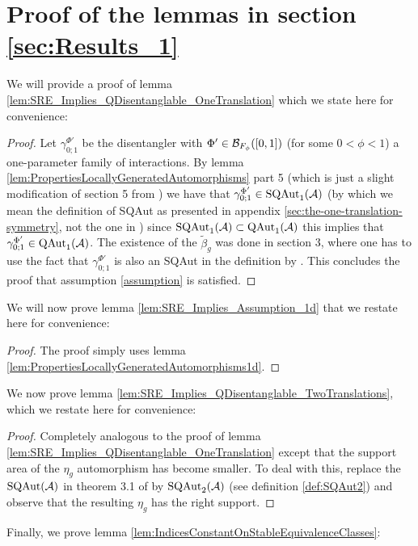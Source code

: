 \documentclass[11pt,a4paper,twoside]{article}
\numberwithin{equation}{section}
\begin{document}
	\section{Proof of the lemmas in section \ref{sec:Results_1}}\label{sec:ProofOfMainResult1}\label{sec:ProofOf:lem:IndicesConstantOnStableEquivalenceClasses}
	We will provide a proof of lemma \ref{lem:SRE_Implies_QDisentanglable_OneTranslation} which we state here for convenience:
	\SREImpliesQDisentanglableOneTranslation*
	\begin{proof}
		Let $\gamma^{\Phi'}_{0;1}$ be the disentangler with $\Phi'\in\BB_{F_\phi}([0,1])$ (for some $0<\phi<1$) a one-parameter family of interactions. By lemma \ref{lem:PropertiesLocallyGeneratedAutomorphisms} part 5 (which is just a slight modification of section 5 from \cite{ogata2021h3gmathbb}) we have that $\gamma^{\Phi'}_{0;1}\in\textrm{SQAut}_1(\AA)$ (by which we mean the definition of SQAut as presented in appendix \ref{sec:the-one-translation-symmetry}, not the one in \cite{ogata2021h3gmathbb}) since $\textrm{SQAut}_1(\AA)\subset\QAut{\AA}$ this implies that $\gamma^{\Phi'}_{0;1}\in\QAut{\AA}$. The existence of the $\tilde{\beta}_g$ was done in \cite{ogata2021h3gmathbb} section 3, where one has to use the fact that $\gamma^{\Phi'}_{0;1}$ is also an SQAut in the definition by \cite{ogata2021h3gmathbb}. This concludes the proof that assumption \ref{assumption} is satisfied.
	\end{proof}
	We will now prove lemma \ref{lem:SRE_Implies_Assumption_1d} that we restate here for convenience:
	\SREImpliesAssumptionOneDimensional*
	\begin{proof}
		The proof simply uses lemma \ref{lem:PropertiesLocallyGeneratedAutomorphisms1d}.
	\end{proof}
	We now prove lemma \ref{lem:SRE_Implies_QDisentanglable_TwoTranslations}, which we restate here for convenience:
	\SREImpliesQDisentanglableTwoTranslations*
	\begin{proof}
		Completely analogous to the proof of lemma \ref{lem:SRE_Implies_QDisentanglable_OneTranslation} except that the support area of the $\eta_g$ automorphism has become smaller. To deal with this, replace the $\textrm{SQAut}(\AA)$ in theorem 3.1 of \cite{ogata2021h3gmathbb} by $\textrm{SQAut}_2(\AA)$ (see definition \ref{def:SQAut2}) and observe that the resulting $\eta_g$ has the right support.
	\end{proof}
	Finally, we prove lemma \ref{lem:IndicesConstantOnStableEquivalenceClasses}:
\end{document}
